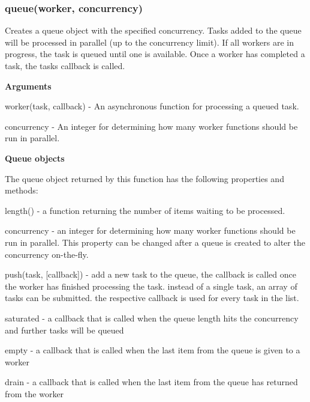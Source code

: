 \label{_queue}%
 \subsubsection*{queue(worker, concurrency)}

Creates a queue object with the specified concurrency. Tasks added to the queue will be processed in parallel (up to the concurrency limit). If all workers are in progress, the task is queued until one is available. Once a worker has completed a task, the task\textquotesingle{}s callback is called.

{\bfseries Arguments}


\begin{DoxyItemize}
\item worker(task, callback) -\/ An asynchronous function for processing a queued task.
\item concurrency -\/ An integer for determining how many worker functions should be run in parallel.
\end{DoxyItemize}

{\bfseries Queue objects}

The queue object returned by this function has the following properties and methods\+:


\begin{DoxyItemize}
\item length() -\/ a function returning the number of items waiting to be processed.
\item concurrency -\/ an integer for determining how many worker functions should be run in parallel. This property can be changed after a queue is created to alter the concurrency on-\/the-\/fly.
\item push(task, \mbox{[}callback\mbox{]}) -\/ add a new task to the queue, the callback is called once the worker has finished processing the task. instead of a single task, an array of tasks can be submitted. the respective callback is used for every task in the list.
\item saturated -\/ a callback that is called when the queue length hits the concurrency and further tasks will be queued
\item empty -\/ a callback that is called when the last item from the queue is given to a worker
\item drain -\/ a callback that is called when the last item from the queue has returned from the worker
\end{DoxyItemize}

